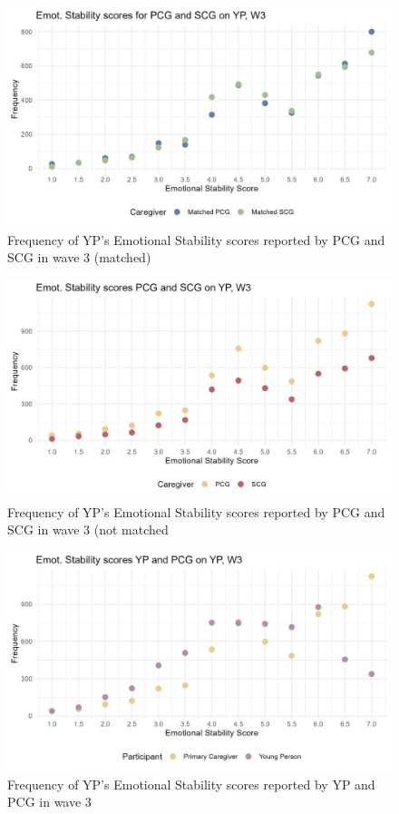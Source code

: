 \documentclass[a4paper]{article}
\begin{document}
\begin{figure}[htbp] 
    \centering
    \includegraphics[width=1\linewidth]{Matched Emotional Stability by participant w3.jpeg}
    \caption{Frequency of YP's Emotional Stability scores reported by PCG and SCG in wave 3 (matched)}
    \label{}
\end{figure}


\begin{figure}[htbp] 
    \centering
    \includegraphics[width=1\linewidth]{Frequency of Emotional Stability by participant w3.jpeg}
    \caption{Frequency of YP's Emotional Stability scores reported by PCG and SCG in wave 3 (not matched}
    \label{}
\end{figure}

\begin{figure}[htbp] 
    \centering
    \includegraphics[width=1\linewidth]{Frequency of Emotional Stability by participant w3a.jpeg}
    \caption{Frequency of YP's Emotional Stability scores reported by YP and PCG in wave 3}
    \label{}
\end{figure}
\end{document}
